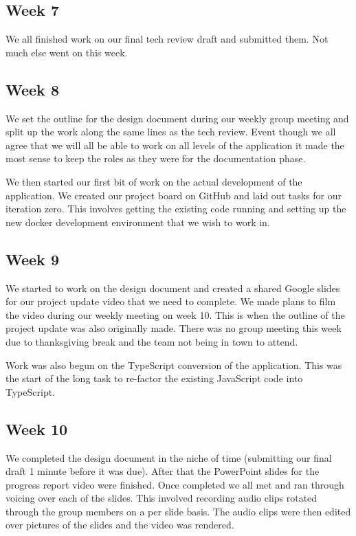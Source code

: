 \documentclass[draftclsnofoot,onecolumn,journal,letterpaper,compsoc,10pt]{IEEEtran}
\begin{document}
    
    \subsection{Week 7}
    We all finished work on our final tech review draft and submitted them.  Not much else went on this week.
    
    
    \subsection{Week 8}
    We set the outline for the design document during our weekly group meeting and split up the work along the same lines as the tech review.  Event though we all agree that we will all be able to work on all levels of the application it made the most sense to keep the roles as they were for the documentation phase.
    
    We then started our first bit of work on the actual development of the application.  We created our project board on GitHub and laid out tasks for our iteration zero.  This involves getting the existing code running and setting up the new docker development environment that we wish to work in.
    
    
    \subsection{Week 9}
    We started to work on the design document and created a shared Google slides for our project update video that we need to complete.  We made plans to film the video during our weekly meeting on week 10.  This is when the outline of the project update was also originally made.  There was no group meeting this week due to thanksgiving break and the team not being in town to attend.
    
    Work was also begun on the TypeScript conversion of the application.  This was the start of the long task to re-factor the existing JavaScript code into TypeScript.
    
    
    \subsection{Week 10}
    We completed the design document in the niche of time (submitting our final draft 1 minute before it was due).  After that the PowerPoint slides for the progress report video were finished.  Once completed we all met and ran through voicing over each of the slides.  This involved recording audio clips rotated through the group members on a per slide basis.  The audio clips were then edited over pictures of the slides and the video was rendered.
    
\end{document}
